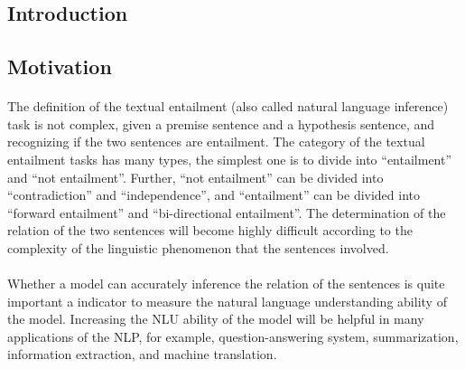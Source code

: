 \documentclass{article}
\begin{document}
\begin{CJK*}{UTF8}{bkai}

\newpage

\doublespacing
\tableofcontents
\singlespacing

\newpage

\listoffigures
\listoftables

\newpage


\section{Introduction} \label{section:introduction}

\subsection{Motivation}
\paragraph{}
The definition of the textual entailment (also called natural language inference) task is not complex, given a premise sentence and a hypothesis sentence, and recognizing if the two sentences are entailment. The category of the textual entailment tasks has many types, the simplest one is to divide into ``entailment'' and ``not entailment''. Further, ``not entailment'' can be divided into ``contradiction'' and ``independence'', and ``entailment'' can be divided into ``forward entailment'' and ``bi-directional entailment''. The determination of the relation of the two sentences will become highly difficult according to the complexity of the linguistic phenomenon that the sentences involved.

\paragraph{}
Whether a model can accurately inference the relation of the sentences is quite important a indicator to measure the natural language understanding ability of the model. Increasing the NLU ability of the model will be helpful in many applications of the NLP, for example, question-answering system, summarization, information extraction, and machine translation.


\end{CJK*}
\end{document}
